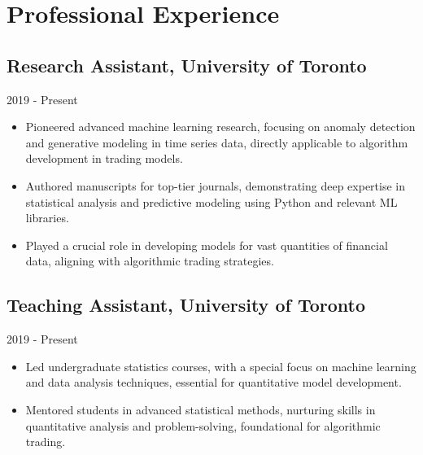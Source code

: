 \section{Professional Experience}
\subsection{Research Assistant, University of Toronto}{2019 - Present}
\begin{itemize}[leftmargin=*]
    \item Pioneered advanced machine learning research, focusing on anomaly detection and generative modeling in time series data, directly applicable to algorithm development in trading models.
    \item Authored manuscripts for top-tier journals, demonstrating deep expertise in statistical analysis and predictive modeling using Python and relevant ML libraries.
    \item Played a crucial role in developing models for vast quantities of financial data, aligning with algorithmic trading strategies.
\end{itemize}

\subsection{Teaching Assistant, University of Toronto}{2019 - Present}
\begin{itemize}[leftmargin=*]
    \item Led undergraduate statistics courses, with a special focus on machine learning and data analysis techniques, essential for quantitative model development.
    \item Mentored students in advanced statistical methods, nurturing skills in quantitative analysis and problem-solving, foundational for algorithmic trading.
\end{itemize}
